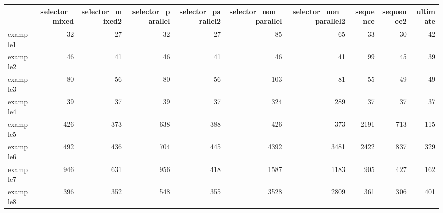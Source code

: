 \begin{tabular}{lrrrrrrrrr}
\toprule
{} &  selector\_mixed &  selector\_mixed2 &  selector\_parallel &  selector\_parallel2 &  selector\_non\_parallel &  selector\_non\_parallel2 &  sequence &  sequence2 &  ultimate \\
\midrule
example1 &              32 &               27 &                 32 &                  27 &                     85 &                      65 &        33 &         30 &        42 \\
example2 &              46 &               41 &                 46 &                  41 &                     46 &                      41 &        99 &         45 &        39 \\
example3 &              80 &               56 &                 80 &                  56 &                    103 &                      81 &        55 &         49 &        49 \\
example4 &              39 &               37 &                 39 &                  37 &                    324 &                     289 &        37 &         37 &        37 \\
example5 &             426 &              373 &                638 &                 388 &                    426 &                     373 &      2191 &        713 &       115 \\
example6 &             492 &              436 &                704 &                 445 &                   4392 &                    3481 &      2422 &        837 &       329 \\
example7 &             946 &              631 &                956 &                 418 &                   1587 &                    1183 &       905 &        427 &       162 \\
example8 &             396 &              352 &                548 &                 355 &                   3528 &                    2809 &       361 &        306 &       401 \\
\bottomrule
\end{tabular}
